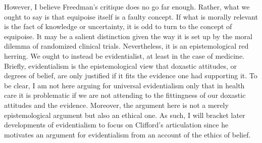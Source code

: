 \documentclass[letterpaper,notitlepage,12pt]{article}
\begin{document}
However, I believe Freedman's critique does no go far enough.
Rather, what we ought to say is that equipoise itself is a faulty concept.
If what is morally relevant is the fact of knowledge or uncertainty, it is odd
to turn to the concept of equipoise.
It may be a salient distinction given the way it is set up by the moral dilemma
of randomized clinical trials.
Nevertheless, it is an epistemological red herring.
We ought to instead be evidentialist, at least in the case of medicine.
Briefly, evidentialism is the epistemological view that doxastic attitudes, or
degrees of belief, are only justified if it fits the evidence one had supporting
it.
To be clear, I am not here arguing for universal evidentialism only that in
health care it is problematic if we are not attending to the fittingness of our
doxastic attitudes and the evidence.
Moreover, the argument here is not a merely epistemological argument but also an
ethical one.
As such, I will bracket later developments of evidentialism to focus on
Clifford's articulation since he motivates an argument for evidentialism from an
account of the ethics of belief.
\end{document}

